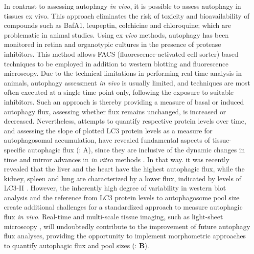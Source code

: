 In contrast to assessing autophagy \textit{in vivo}, it is possible to assess autophagy in tissues ex vivo. This approach eliminates the risk of toxicity and bioavailability of compounds such as BafA1, leupeptin, colchicine and chloroquine; which are problematic in animal studies. Using ex \textit{vivo} methods, autophagy has been monitored in retina \citep{Esteban-Martinez2015} and organotypic cultures in the presence of protease inhibitors. This method allows FACS (fluorescence-activated cell sorter) based techniques to be employed in addition to western blotting and fluorescence microscopy. Due to the technical limitations in performing real-time analysis in animals, autophagy assessment \textit{in vivo} is usually limited, and techniques are most often executed at a single time point only, following the exposure to suitable inhibitors. Such an approach is thereby providing a measure of basal or induced autophagy flux, assessing whether flux remains unchanged, is increased or decreased. Nevertheless, attempts to quantify respective protein levels over time, and assessing the slope of plotted LC3 protein levels as a measure for autophagosomal accumulation, have revealed fundamental aspects of tissue-specific autophagic flux \citep{Haspel2011} (: A), since they are inclusive of the dynamic changes in time and mirror advances in \textit{in vitro} methods \citep{DuToit2018b}. In that way. it was recently revealed that the liver and the heart have the highest autophagic flux, while the kidney, spleen and lung are characterized by a lower flux, indicated by levels of LC3-II \citep{Haspel2011}. However, the inherently high degree of variability in western blot analysis and the reference from LC3 protein levels to autophagosome pool size create additional challenges for a standardized approach to measure autophagic flux \textit{in vivo}. Real-time and multi-scale tissue imaging, such as light-sheet microscopy \citep{Pampaloni2013}, will undoubtedly contribute to the improvement of future autophagy flux analyses, providing the opportunity to implement morphometric approaches to quantify autophagic flux and pool sizes (: \textbf{B}). 

